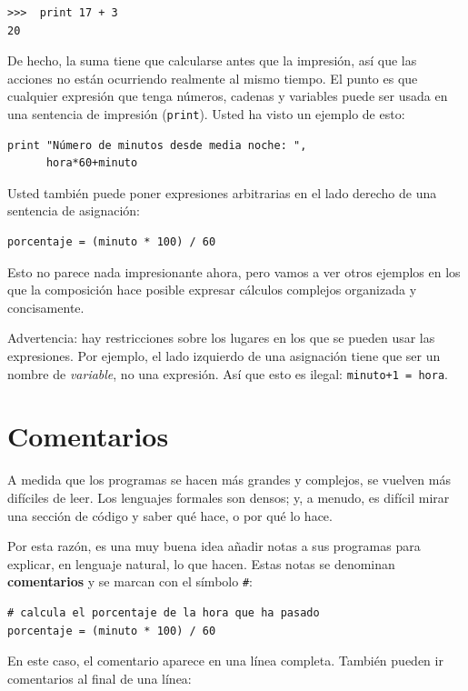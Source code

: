 \beforeverb
\begin{verbatim}
>>>  print 17 + 3
20
\end{verbatim}
\afterverb
%
De hecho, la suma tiene que calcularse antes que la impresión, así que las
acciones no están ocurriendo realmente al mismo tiempo. El punto es que  
cualquier expresión que tenga números, cadenas y variables puede ser usada
en una sentencia de impresión (\texttt{print}).  Usted ha visto un ejemplo 
de esto:

\beforeverb
\begin{verbatim}
print "Número de minutos desde media noche: ", 
      hora*60+minuto
\end{verbatim}
\afterverb
%
Usted también puede poner  expresiones arbitrarias en el lado derecho de
una sentencia de asignación:

\beforeverb
\begin{verbatim}
porcentaje = (minuto * 100) / 60
\end{verbatim}
\afterverb
%
Esto no parece nada impresionante ahora, pero vamos a ver otros ejemplos
en los que la composición hace posible expresar cálculos complejos organizada
y concisamente.

Advertencia: hay restricciones sobre los lugares en los que 
se pueden usar las expresiones. Por ejemplo, el lado izquierdo de una asignación tiene que ser
un nombre de {\em variable}, no una expresión.  Así que esto es ilegal:
\texttt{minuto+1 = hora}.


\section{Comentarios}


A medida que los programas se hacen más grandes y complejos, se vuelven más
difíciles de leer. Los lenguajes formales son densos; y, a menudo, es difícil
mirar una sección de código y saber qué hace, o por qué lo hace.

Por esta razón, es una muy buena idea añadir notas a sus programas para
explicar, en lenguaje natural, lo que hacen. Estas notas se denominan
{\bf comentarios }y se marcan con el símbolo \texttt{\#}:

\beforeverb
\begin{verbatim}
# calcula el porcentaje de la hora que ha pasado
porcentaje = (minuto * 100) / 60
\end{verbatim}
\afterverb
%
En este caso, el comentario aparece en una línea completa. También pueden ir comentarios al final de una línea:


